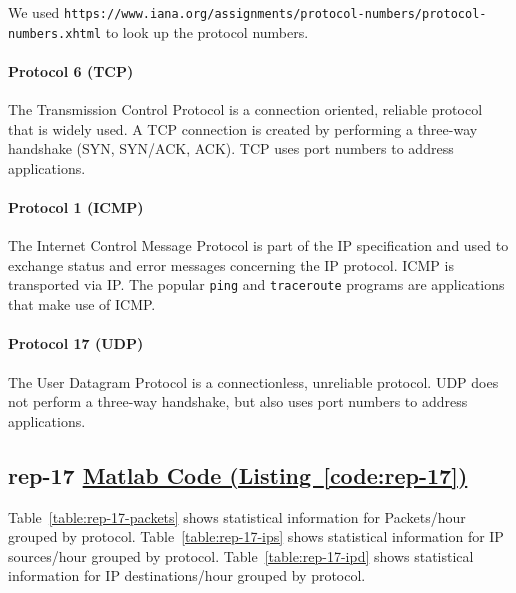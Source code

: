 \documentclass{article}
\newcommand{\codelink}[1]{%
    \hyperref[#1]{\quad\faArrowCircleRight\enskip Matlab Code (Listing~\ref{#1})}%
}
\begin{document}
We used \texttt{https://www.iana.org/assignments/protocol-numbers/protocol-numbers.xhtml} to look up the
protocol numbers.

\paragraph{Protocol 6 (TCP)}
The Transmission Control Protocol is a connection oriented, reliable protocol that is widely used.
A TCP connection is created by performing a three-way handshake (SYN, SYN/ACK, ACK). TCP uses
port numbers to address applications.

\paragraph{Protocol 1 (ICMP)}
The Internet Control Message Protocol is part of the IP specification and used to exchange status and
error messages concerning the IP protocol. ICMP is transported via IP. The popular \texttt{ping} and
\texttt{traceroute} programs are applications that make use of ICMP.

\paragraph{Protocol 17 (UDP)}
The User Datagram Protocol is a connectionless, unreliable protocol. UDP does not perform
a three-way handshake, but also uses port numbers to address applications.

\subsection{rep-17 \codelink{code:rep-17}}

Table~\ref{table:rep-17-packets} shows statistical information for Packets/hour grouped by protocol.
Table~\ref{table:rep-17-ips} shows statistical information for IP sources/hour grouped by protocol.
Table~\ref{table:rep-17-ipd} shows statistical information for IP destinations/hour grouped by protocol.
\end{document}
